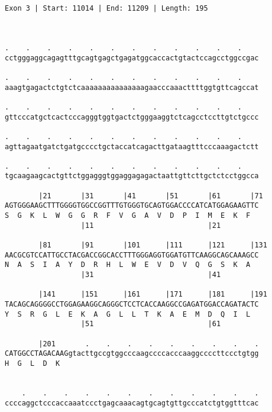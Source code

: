 \documentclass{article}
\begin{document}
\begin{Verbatim}
                                                        
 
Exon 3 | Start: 11014 | End: 11209 | Length: 195



.    .    .    .    .    .    .    .    .    .    .    .    
cctgggaggcagagtttgcagtgagctgagatggcaccactgtactccagcctggccgac
                                                            
.    .    .    .    .    .    .    .    .    .    .    .    
aaagtgagactctgtctcaaaaaaaaaaaaaaagaacccaaacttttggtgttcagccat
                                                            
.    .    .    .    .    .    .    .    .    .    .    .    
gttcccatgctcactcccagggtggtgactctgggaaggtctcagcctccttgtctgccc
                                                            
.    .    .    .    .    .    .    .    .    .    .    .    
agttagaatgatctgatgcccctgctaccatcagacttgataagtttcccaaagactctt
                                                            
.    .    .    .    .    .    .    .    .    .    .    .    
tgcaagaagcactgttctggagggtggaggagagactaattgttcttgctctcctggcca
                                                            
        |21       |31       |41       |51       |61       |71
AGTGGGAAGCTTTGGGGTGGCCGGTTTGTGGGTGCAGTGGACCCCATCATGGAGAAGTTC
S  G  K  L  W  G  G  R  F  V  G  A  V  D  P  I  M  E  K  F  
                  |11                           |21         
  
        |81       |91       |101      |111      |121      |131
AACGCGTCCATTGCCTACGACCGGCACCTTTGGGAGGTGGATGTTCAAGGCAGCAAAGCC
N  A  S  I  A  Y  D  R  H  L  W  E  V  D  V  Q  G  S  K  A  
                  |31                           |41         
  
        |141      |151      |161      |171      |181      |191
TACAGCAGGGGCCTGGAGAAGGCAGGGCTCCTCACCAAGGCCGAGATGGACCAGATACTC
Y  S  R  G  L  E  K  A  G  L  L  T  K  A  E  M  D  Q  I  L  
                  |51                           |61         
  
        |201       .    .    .    .    .    .    .    .    .
CATGGCCTAGACAAGgtacttgccgtggcccaagccccacccaaggccccttccctgtgg
H  G  L  D  K                                               
                                                            
  
    .    .    .    .    .    .    .    .    .    .    .    .
ccccaggctcccaccaaatccctgagcaaacagtgcagtgttgcccatctgtggtttcac
                                                            

\end{Verbatim}
\end{document}
